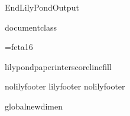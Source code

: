 
\def\ifundefined#1{\expandafter\ifx\csname#1\endcsname\relax}


\ifx\mustmakelilypondtitle\undefined\else\makelilypondtitle\fi
\ifx\mustmakelilypondpiecetitle\undefined\else\makelilypondpiecetitle\fi
%
\def\SkipLilydefs{\endinput}
\ifundefined{EndLilyPondOutput}
        \def\EndLilyPondOutput{\csname bye\endcsname}
        \def\SkipLilydefs{}
\fi
\SkipLilydefs

\ifundefined{documentclass}
        
\else
        
\fi



\font\fetasixteen=feta16
\def\fetafont{\fetasixteen}
\def\fetachar#1{\hbox{\fetasixteen#1}}


\def\botalign#1{\vbox to 0pt{\vss #1}}
\def\leftalign#1{\hbox to 0pt{#1\hss}}


%
%

\def\myfilbreak{} %


\ifundefined{lilypondpaperinterscorelinefill}
        \def\lilypondpaperinterscorelinefill{0}
\else
        \def\lilypondpaperinterscorelinefill{1}
\fi

\def\interscoreline{\vskip \lilypondpaperinterscoreline \lilypondpaperunit plus \lilypondpaperinterscorelinefill fill}

\def\placebox#1#2#3{%
        \botalign{\hbox{\raise #1\leftalign{\kern #2{}#3}}}}%

\ifx\pdfoutput\undefined  
  
\else
  \ifx\pdfoutput\relax
    
  \else
    
  \fi
\fi

\def\EndLilyPondOutput{%
\ifundefined{lilypondpaperlastpagefill}%
  \vskip 0pt plus \lilypondpaperinterscorelinefill00 fill
\fi
\csname bye\endcsname}


\ifx\csname nolilyfooter\endcsname\relax
        \csname lilyfooter\texsuffix\endcsname%
\else
        \csname%
        nolilyfooter\texsuffix\endcsname
\fi

\ifx\outputscale\undefined
        \csname global\endcsname\csname newdimen\endcsname\outputscale
\fi
\endinput
